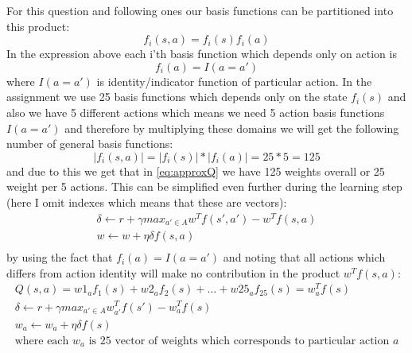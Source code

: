 \documentclass[a4paper,11pt]{article}
\theoremstyle{mytheor}
\begin{document}
For this question and following ones our basis functions can be partitioned into this product:
\begin{equation}
    f_{i}(s, a) = f_{i}(s) f_{i}(a)
\end{equation}
In the expression above each i'th basis function which depends only on action is  \[ f_{i}(a) = I(a=a')\] where $I(a=a')$ is identity/indicator function of particular action. In the assignment we use 25 basis functions which depends only on the state $f_{i}(s)$ and also we have 5 different actions which means we need 5 action basis functions $I(a=a')$ and therefore by multiplying these domains we will get the following number of general basis functions:
\begin{equation}
|f_{i}(s, a)| = |f_{i}(s)| * |f_{i}(a)| = 25 * 5 = 125
\end{equation}
and due to this we get that in \ref{eq:approxQ} we have 125 weights overall or 25 weight per 5 actions. This can be simplified even further during the learning step (here I omit indexes which means that these are vectors):
\begin{align}
\delta \leftarrow r + \gamma max_{a' \in A} w^{T} f(s', a') - w^{T} f(s, a) \\
w \leftarrow w + \eta \delta f(s, a) \\
\end{align}
by using the fact that $f_{i}(a) = I(a=a')$ and noting that all actions which differs from action identity will make no contribution in the product $w^{T} f(s, a)$: 
\begin{align}
    \label{eq:simpleApprox}
Q(s,a) = w1_a f_{1}(s) + w2_a f_{2}(s) + \ldots + w25_a f_{25}(s) = w^{T}_{a} f(s) \\
\delta \leftarrow r + \gamma max_{a' \in A} w^{T}_{a'} f(s') - w^{T}_{a} f(s) \\
w_a \leftarrow w_a + \eta \delta f(s) \\
\text{where each $w_a$ is 25 vector of weights which corresponds to particular action $a$}
\end{align}
\end{document}

